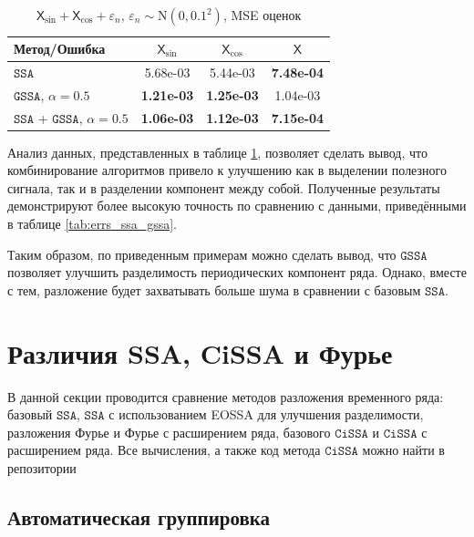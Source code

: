 \documentclass[12pt, specialist, subf
]{disser}
\theoremstyle{definition}
\newcommand{\SSA}{\texttt{SSA}}
\newcommand{\GSSA}{\texttt{GSSA}}
\newcommand{\CISSA}{\texttt{CiSSA}}
\newcommand{\TS}{\mathsf{X}}
\begin{document}
\begin{table}[H]
	\centering
	\caption{$\TS_{\sin} + \TS_{\cos}+
			\varepsilon_n$, $\varepsilon_n \sim \mathrm N(0, 0.1^2)$, MSE оценок }
	\label{tab:errs_ssa_gssa_unite}
	\begin{tabular}{l|ccc}
		\hline
		Метод/Ошибка                     & $\TS_{\sin}$      & $\TS_{\cos}$      & $\TS$             \\
		\hline
		$\SSA$                           & 5.68e-03          & 5.44e-03          & \textbf{7.48e-04} \\
		$\GSSA$, $\alpha = 0.5$          & \textbf{1.21e-03} & \textbf{1.25e-03} & 1.04e-03          \\
		\hline
		$\SSA$ + $\GSSA$, $\alpha = 0.5$ & \textbf{1.06e-03} & \textbf{1.12e-03} & \textbf{7.15e-04} \\
		\hline
	\end{tabular}
\end{table}

Анализ данных, представленных в таблице \ref{tab:errs_ssa_gssa_unite}, позволяет сделать вывод, что комбинирование алгоритмов привело к улучшению как в выделении полезного сигнала, так и в разделении компонент между собой. Полученные результаты демонстрируют более высокую точность по сравнению с данными, приведёнными в таблице \ref{tab:errs_ssa_gssa}.


Таким образом, по приведенным примерам можно сделать вывод, что $\GSSA$ позволяет улучшить разделимость периодических компонент ряда. Однако, вместе с тем, разложение будет захватывать больше шума в сравнении с базовым $\SSA$.




\newpage





\section{Различия SSA, CiSSA и Фурье}

\label{sec:comparison_cissa}
В данной секции проводится сравнение методов разложения временного ряда: базовый $\SSA$,  $\SSA$ с использованием EOSSA для улучшения разделимости, разложения Фурье и Фурье с расширением ряда, базового $\CISSA$ и $\CISSA$ с расширением ряда. Все вычисления, а также код метода $\CISSA$ можно найти в репозитории \cite{spbu_cissa_coursework_github}


\subsection{Автоматическая группировка}
\end{document}

